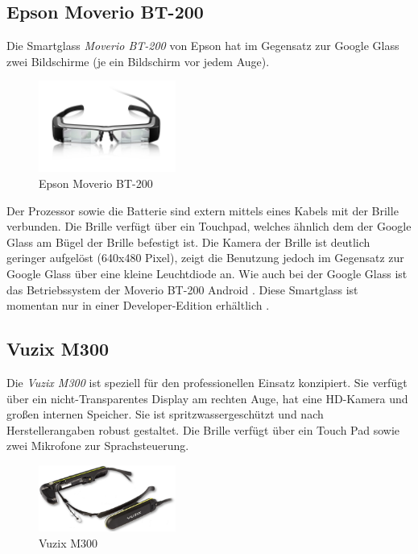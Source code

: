 \subsection{Epson Moverio BT-200}
\label{sec:Epson_Moverio_BT-200}
Die Smartglass \emph{Moverio BT-200} von Epson hat im Gegensatz zur Google Glass zwei Bildschirme (je ein Bildschirm vor jedem Auge). 
%
\begin{figure}[htbp]
    \centering
    \includegraphics[width=0.4\textwidth]{data/bilder/Moverio_BT-200.png}
    \caption{Epson Moverio BT-200 \cite{Epson}}
    \label{fig:BT-200}
\end{figure}
%
Der Prozessor sowie die Batterie sind extern mittels eines Kabels mit der Brille verbunden. Die Brille verfügt über ein Touchpad, welches ähnlich dem der Google Glass am Bügel der Brille befestigt ist. Die Kamera der Brille ist deutlich geringer aufgelöst (640x480 Pixel), zeigt die Benutzung jedoch im Gegensatz zur Google Glass über eine kleine Leuchtdiode an. Wie auch bei der Google Glass ist das Betriebssystem der Moverio BT-200 Android \cite[S.~32]{Schwenke2016}. Diese Smartglass ist momentan nur in einer Developer-Edition erhältlich \cite{Epson}.
%
%
%
%
%
%
\subsection{Vuzix M300}
\label{sec:Vuzix_M300}
Die \emph{Vuzix M300} ist speziell für den professionellen Einsatz konzipiert. Sie verfügt über ein nicht-Transparentes Display am rechten Auge, hat eine HD-Kamera und großen internen Speicher. Sie ist spritzwassergeschützt und nach Herstellerangaben robust gestaltet. Die Brille verfügt über ein Touch Pad sowie zwei Mikrofone zur Sprachsteuerung. 
%
\begin{figure}[htbp]
    \centering
    \includegraphics[width=0.4\textwidth]{data/bilder/m300-top.png}
    \caption{Vuzix M300 \cite{Vuzix2018}}
    \label{fig:Vuzix_M300}
\end{figure}
%

